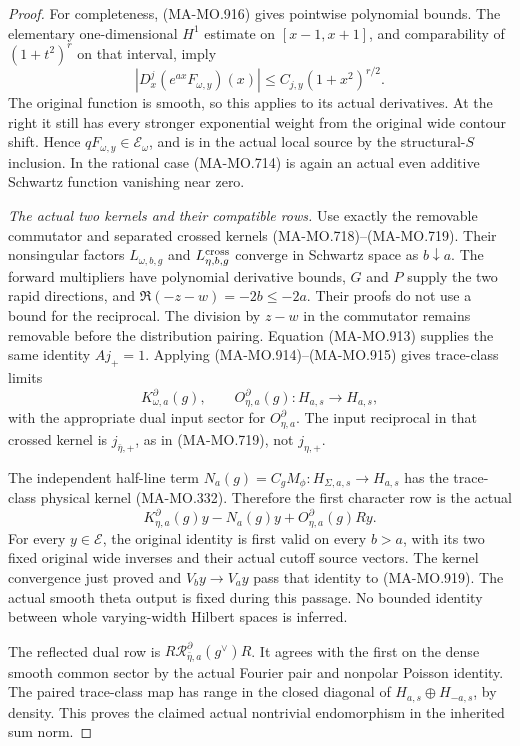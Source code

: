 \begin{proof}
For completeness, (MA-MO.916) gives
pointwise polynomial bounds. The elementary
one-dimensional \(H^1\) estimate on
\([x-1,x+1]\), and comparability of
\((1+t^2)^r\) on that interval, imply
\[
 |D_x^j(e^{ax}F_{\omega,y})(x)|
                   \le C_{j,y}(1+x^2)^{r/2}.
 \tag{MA-MO.917}
\]
The original function is smooth, so this
applies to its actual derivatives. At the
right it still has every stronger
exponential weight from the original
wide contour shift. Hence
\(qF_{\omega,y}\in\mathcal E_\omega\),
and is in the actual local source by
the structural-\(S\) inclusion. In the
rational case (MA-MO.714) is again an
actual even additive Schwartz function
vanishing near zero.

\emph{The actual two kernels and their compatible rows.}
Use exactly the removable commutator and
separated crossed kernels (MA-MO.718)--(MA-MO.719).
Their nonsingular factors
\(L_{\omega,b,g}\) and
\(L^{\rm cross}_{\eta,b,g}\)
converge in Schwartz space as \(b\downarrow a\).
The forward multipliers have polynomial
derivative bounds, \(G\) and \(P\) supply
the two rapid directions, and
\(\Re(-z-w)=-2b\le-2a\).
Their proofs do not use a bound for the
reciprocal. The division by \(z-w\)
in the commutator remains removable
before the distribution pairing.
Equation (MA-MO.913) supplies the same
identity \(A j_+=1\).
Applying (MA-MO.914)--(MA-MO.915) gives
trace-class limits
\[
     K_{\omega,a}^{\partial}(g),\qquad
     O_{\eta,a}^{\partial}(g):
               H_{a,s}\longrightarrow H_{a,s},
 \tag{MA-MO.918}
\]
with the appropriate dual input sector
for \(O_{\eta,a}^{\partial}\).
The input reciprocal in that crossed
kernel is \(j_{\bar\eta,+}\), as in
(MA-MO.719), not \(j_{\eta,+}\).

The independent half-line term
\(N_a(g)=C_gM_\phi:H_{\Sigma,a,s}\to H_{a,s}\)
has the trace-class physical kernel
(MA-MO.332). Therefore the first
character row is the actual
\[
       K_{\eta,a}^{\partial}(g)y
              -N_a(g)y+O_{\eta,a}^{\partial}(g)Ry .
 \tag{MA-MO.919}
\]
For every \(y\in\mathcal E\), the original
identity is first valid on every \(b>a\),
with its two fixed original wide inverses
and their actual cutoff source vectors.
The kernel convergence just proved and
\(V_by\to V_ay\) pass that identity
to (MA-MO.919). The actual smooth
theta output is fixed during this
passage. No bounded identity between
whole varying-width Hilbert spaces
is inferred.

The reflected dual row is
\(R\mathscr R_{\bar\eta,a}^{\partial}(g^\vee)R\).
It agrees with the first on the dense
smooth common sector by the actual
Fourier pair and nonpolar Poisson
identity. The paired trace-class
map has range in the closed diagonal
of \(H_{a,s}\oplus H_{-a,s}\), by
density. This proves the claimed
actual nontrivial endomorphism in
the inherited sum norm.


\end{proof}
